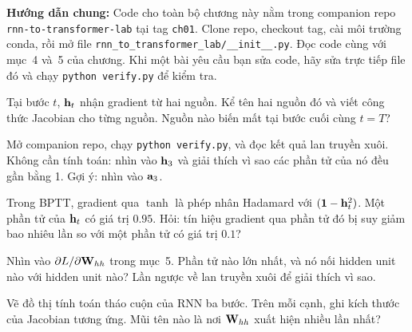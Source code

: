 %

\exercises

%

\par\textbf{Hướng dẫn chung:} Code cho toàn bộ chương này nằm trong companion
repo \texttt{rnn-to-transformer-lab} tại tag \texttt{ch01}. Clone repo, checkout
tag, cài môi trường conda, rồi mở file
\texttt{rnn_to_transformer_lab/__init__.py}. Đọc code cùng với mục~4
và~5 của chương. Khi một bài yêu cầu bạn sửa code, hãy sửa trực tiếp file đó
và chạy \texttt{python verify.py} để kiểm tra.

%

\tierunderstand

\begin{bt}
  \item Tại bước $t$, $\mathbf{h}_t$ nhận gradient từ hai nguồn. Kể tên hai
    nguồn đó và viết công thức Jacobian cho từng nguồn. Nguồn nào biến mất
    tại bước cuối cùng $t = T$?

  \item Mở companion repo, chạy \texttt{python verify.py}, và đọc
    kết quả lan truyền xuôi. Không cần tính toán: nhìn vào $\mathbf{h}_3$ và
    giải thích vì sao các phần tử của nó đều gần bằng 1. Gợi ý: nhìn vào
    $\mathbf{a}_3$.

  \item Trong BPTT, gradient qua $\tanh$ là phép nhân Hadamard với
    $(\mathbf{1} - \mathbf{h}_t^2)$. Một phần tử của $\mathbf{h}_t$ có giá trị
    $0.95$. Hỏi: tín hiệu gradient qua phần tử đó bị suy giảm bao nhiêu lần
    so với một phần tử có giá trị $0.1$?

  \item Nhìn vào $\partial L / \partial \mathbf{W}_{hh}$ trong mục~5. Phần tử
    nào lớn nhất, và nó nối hidden unit nào với hidden unit nào? Lần ngược
    về lan truyền xuôi để giải thích vì sao.

  \item Vẽ đồ thị tính toán tháo cuộn của RNN ba bước. Trên mỗi cạnh, ghi
    kích thước của Jacobian tương ứng. Mũi tên nào là nơi $\mathbf{W}_{hh}$ xuất
    hiện nhiều lần nhất?
\end{bt}

\tierapply

%

